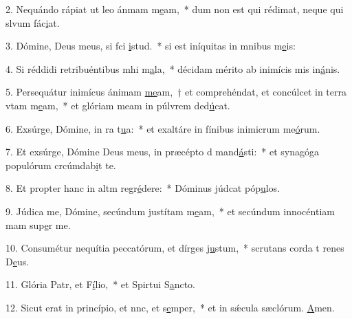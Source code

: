 2. Nequándo rápiat ut leo ánmam m\uline{e}am,~* dum non est qui rédimat, neque qui slvum fác\uline{i}at.\par 
3. Dómine, Deus meus, si fci \uline{i}stud.~* si est iníquitas in mnibus m\uline{e}is:\par 
4. Si réddidi retribuéntibus mhi m\uline{a}la,~* décidam mérito ab inimícis mis in\uline{á}nis.\par 
5. Persequátur inimícus ánimam \uline{me}am,~† et comprehéndat, et concúlcet in terra vtam m\uline{e}am,~* et glóriam meam in púlvrem ded\uline{ú}cat.\par 
6. Exsúrge, Dómine, in ra t\uline{u}a:~* et exaltáre in fínibus inimicrum me\uline{ó}rum.\par 
7. Et exsúrge, Dómine Deus meus, in præcépto d mand\uline{á}sti:~* et synagóga populórum crcúmdab\uline{i}t te.\par 
8. Et propter hanc in altm regr\uline{é}dere:~* Dóminus júdcat póp\uline{u}los.\par 
9. Júdica me, Dómine, secúndum justítam m\uline{e}am,~* et secúndum innocéntiam mam sup\uline{e}r me.\par 
10. Consumétur nequítia peccatórum, et dírges j\uline{u}stum,~* scrutans corda t renes D\uline{e}us.\par 
11. Glória Patr, et F\uline{í}lio,~* et Spirtui S\uline{a}ncto.\par 
12. Sicut erat in princípio, et nnc, et s\uline{e}mper,~* et in sǽcula sæclórum. \uline{A}men.\par 

